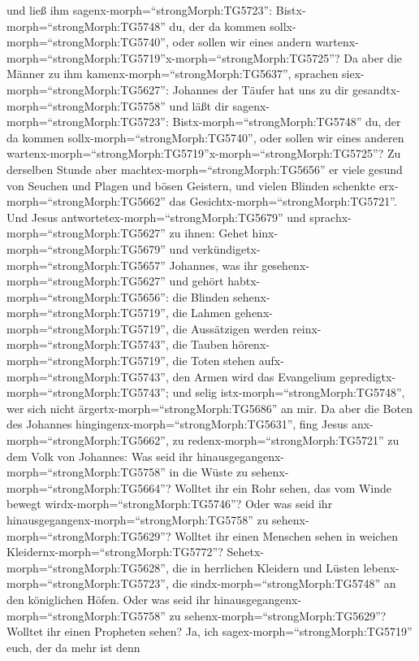 und ließ ihm sagenx-morph=``strongMorph:TG5723'':
Bistx-morph=``strongMorph:TG5748'' du, der da kommen
sollx-morph=``strongMorph:TG5740'', oder sollen wir eines andern
wartenx-morph=``strongMorph:TG5719''\textbar x-morph=``strongMorph:TG5725''?
 Da aber die Männer zu ihm
kamenx-morph=``strongMorph:TG5637'', sprachen
siex-morph=``strongMorph:TG5627'': Johannes der Täufer hat uns zu dir
gesandtx-morph=``strongMorph:TG5758'' und läßt dir
sagenx-morph=``strongMorph:TG5723'': Bistx-morph=``strongMorph:TG5748''
du, der da kommen sollx-morph=``strongMorph:TG5740'', oder sollen wir
eines anderen
wartenx-morph=``strongMorph:TG5719''\textbar x-morph=``strongMorph:TG5725''?
 Zu derselben Stunde aber
machtex-morph=``strongMorph:TG5656'' er viele gesund von Seuchen und
Plagen und bösen Geistern, und vielen Blinden schenkte
erx-morph=``strongMorph:TG5662'' das
Gesichtx-morph=``strongMorph:TG5721''.  Und Jesus
antwortetex-morph=``strongMorph:TG5679'' und
sprachx-morph=``strongMorph:TG5627'' zu ihnen: Gehet
hinx-morph=``strongMorph:TG5679'' und
verkündigetx-morph=``strongMorph:TG5657'' Johannes, was ihr
gesehenx-morph=``strongMorph:TG5627'' und gehört
habtx-morph=``strongMorph:TG5656'': die Blinden
sehenx-morph=``strongMorph:TG5719'', die Lahmen
gehenx-morph=``strongMorph:TG5719'', die Aussätzigen werden
reinx-morph=``strongMorph:TG5743'', die Tauben
hörenx-morph=``strongMorph:TG5719'', die Toten stehen
aufx-morph=``strongMorph:TG5743'', den Armen wird das Evangelium
gepredigtx-morph=``strongMorph:TG5743'';  und selig
istx-morph=``strongMorph:TG5748'', wer sich nicht
ärgertx-morph=``strongMorph:TG5686'' an mir.  Da aber die
Boten des Johannes hingingenx-morph=``strongMorph:TG5631'', fing Jesus
anx-morph=``strongMorph:TG5662'', zu redenx-morph=``strongMorph:TG5721''
zu dem Volk von Johannes: Was seid ihr
hinausgegangenx-morph=``strongMorph:TG5758'' in die Wüste zu
sehenx-morph=``strongMorph:TG5664''? Wolltet ihr ein Rohr sehen, das vom
Winde bewegt wirdx-morph=``strongMorph:TG5746''?  Oder was
seid ihr hinausgegangenx-morph=``strongMorph:TG5758'' zu
sehenx-morph=``strongMorph:TG5629''? Wolltet ihr einen Menschen sehen in
weichen Kleidernx-morph=``strongMorph:TG5772''?
Sehetx-morph=``strongMorph:TG5628'', die in herrlichen Kleidern und
Lüsten lebenx-morph=``strongMorph:TG5723'', die
sindx-morph=``strongMorph:TG5748'' an den königlichen Höfen.
 Oder was seid ihr
hinausgegangenx-morph=``strongMorph:TG5758'' zu
sehenx-morph=``strongMorph:TG5629''? Wolltet ihr einen Propheten sehen?
Ja, ich sagex-morph=``strongMorph:TG5719'' euch, der da mehr ist denn
